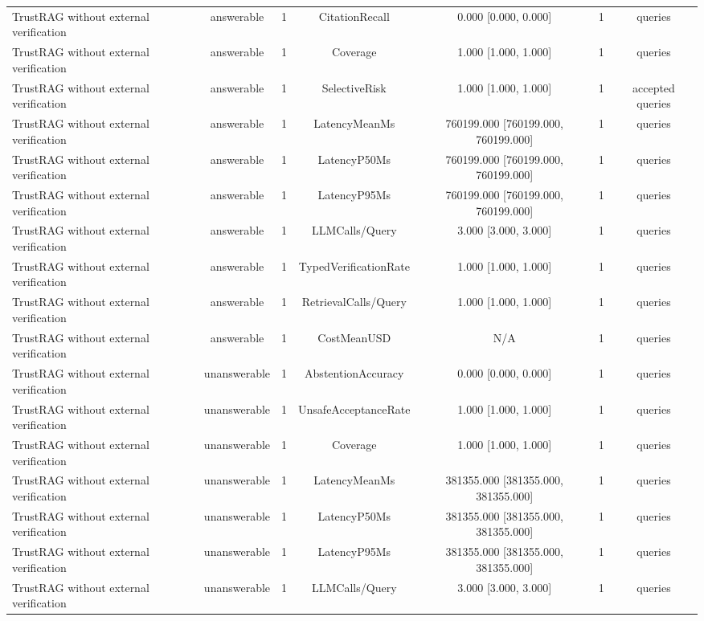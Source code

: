 {\begin{tabular}{lcccccc}
TrustRAG without external verification & answerable & 1 & CitationRecall & 0.000 [0.000, 0.000] & 1 & queries \\
TrustRAG without external verification & answerable & 1 & Coverage & 1.000 [1.000, 1.000] & 1 & queries \\
TrustRAG without external verification & answerable & 1 & SelectiveRisk & 1.000 [1.000, 1.000] & 1 & accepted queries \\
TrustRAG without external verification & answerable & 1 & LatencyMeanMs & 760199.000 [760199.000, 760199.000] & 1 & queries \\
TrustRAG without external verification & answerable & 1 & LatencyP50Ms & 760199.000 [760199.000, 760199.000] & 1 & queries \\
TrustRAG without external verification & answerable & 1 & LatencyP95Ms & 760199.000 [760199.000, 760199.000] & 1 & queries \\
TrustRAG without external verification & answerable & 1 & LLMCalls/Query & 3.000 [3.000, 3.000] & 1 & queries \\
TrustRAG without external verification & answerable & 1 & TypedVerificationRate & 1.000 [1.000, 1.000] & 1 & queries \\
TrustRAG without external verification & answerable & 1 & RetrievalCalls/Query & 1.000 [1.000, 1.000] & 1 & queries \\
TrustRAG without external verification & answerable & 1 & CostMeanUSD & N/A & 1 & queries \\
TrustRAG without external verification & unanswerable & 1 & AbstentionAccuracy & 0.000 [0.000, 0.000] & 1 & queries \\
TrustRAG without external verification & unanswerable & 1 & UnsafeAcceptanceRate & 1.000 [1.000, 1.000] & 1 & queries \\
TrustRAG without external verification & unanswerable & 1 & Coverage & 1.000 [1.000, 1.000] & 1 & queries \\
TrustRAG without external verification & unanswerable & 1 & LatencyMeanMs & 381355.000 [381355.000, 381355.000] & 1 & queries \\
TrustRAG without external verification & unanswerable & 1 & LatencyP50Ms & 381355.000 [381355.000, 381355.000] & 1 & queries \\
TrustRAG without external verification & unanswerable & 1 & LatencyP95Ms & 381355.000 [381355.000, 381355.000] & 1 & queries \\
TrustRAG without external verification & unanswerable & 1 & LLMCalls/Query & 3.000 [3.000, 3.000] & 1 & queries \\

\end{tabular}}
